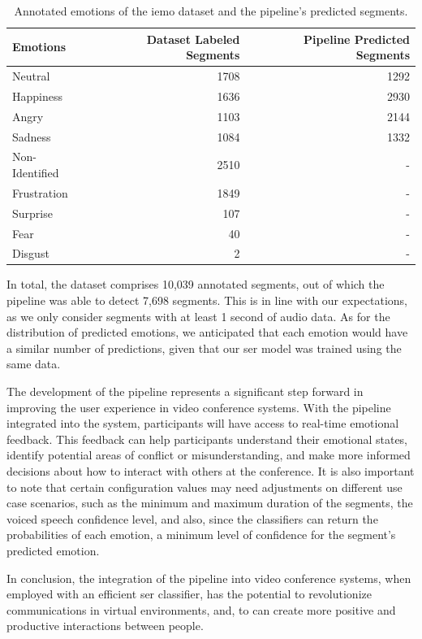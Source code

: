 \begin{table}[H]
	\centering
	\caption{Annotated emotions of the \ac{iemo} dataset and the pipeline's predicted segments.}
	\label{tab:iemopipeline}
	\begin{tabular}{lrr}
		\toprule
		Emotions & Dataset Labeled Segments & Pipeline Predicted Segments \\
		\midrule
		Neutral & 1708 & 1292 \\
		Happiness & 1636 & 2930 \\
		Angry & 1103 & 2144 \\
		Sadness & 1084 & 1332 \\
		Non-Identified & 2510 & - \\
		Frustration & 1849 & - \\
		Surprise	& 107 & - \\
		Fear & 40 & - \\
		Disgust & 2 & - \\
		\bottomrule
	\end{tabular}
\end{table}

In total, the dataset comprises 10,039 annotated segments, out of which the pipeline was able to detect 7,698 segments. This is in line with our expectations, as we only consider segments with at least 1 second of audio data. As for the distribution of predicted emotions, we anticipated that each emotion would have a similar number of predictions, given that our \ac{ser} model was trained using the same data.

The development of the pipeline represents a significant step forward in improving the user experience in video conference systems. With the pipeline integrated into the system, participants will have access to real-time emotional feedback. This feedback can help participants understand their emotional states, identify potential areas of conflict or misunderstanding, and make more informed decisions about how to interact with others at the conference. It is also important to note that certain configuration values may need adjustments on different use case scenarios, such as the minimum and maximum duration of the segments, the voiced speech confidence level, and also, since the classifiers can return the probabilities of each emotion, a minimum level of confidence for the segment's predicted emotion.

In conclusion, the integration of the pipeline into video conference systems, when employed with an efficient \ac{ser} classifier, has the potential to revolutionize communications in virtual environments, and, to can create more positive and productive interactions between people.
